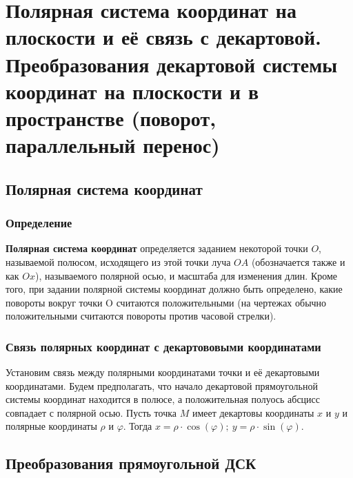 \documentclass{article}
\begin{document}
\section{Полярная система координат на плоскости и её связь с декартовой. Преобразования декартовой системы координат на плоскости и в пространстве (поворот, параллельный перенос)}
\subsection{Полярная система координат}
\subsubsection{Определение}
\textbf{Полярная система координат} определяется заданием некоторой точки $O$, называемой полюсом, исходящего из этой точки луча $OA$ (обозначается также и как $Ox$), называемого полярной осью, и масштаба для изменения длин. Кроме того, при задании полярной системы координат должно быть определено, какие повороты вокруг точки O считаются положительными (на чертежах обычно положительными считаются повороты против часовой стрелки).
\subsubsection{Связь полярных координат с декартововыми координатами}
Установим связь между полярными координатами точки и её декартовыми координатами. Будем предполагать, что начало декартовой прямоугольной системы координат находится в полюсе, а положительная полуось абсцисс совпадает с полярной осью. Пусть точка $M$ имеет декартовы координаты $x$ и $y$ и полярные координаты $\rho$ и $\varphi$. Тогда $x=\rho\cdot\cos(\varphi);\:y=\rho\cdot\sin(\varphi)$.
\subsection{Преобразования прямоугольной ДСК}
\end{document}
